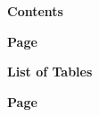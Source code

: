 \renewcommand{\thepage}{(\arabic{page})}
\setcounter{page}{3}         %

\begin{center}
  {\bfseries Contents \par}
\end{center}
\vspace{0.5em}
\noindent\hfill\textbf{Page}\par   %
\vspace{-0.5em}
\makeatletter{}\makeatother

\newpage
\begin{center}
  {\bfseries List of Tables \par}
\end{center}
\vspace{0.5em}
\noindent\hfill\textbf{Page}\par   %
\vspace{-0.5em}
\makeatletter{}\makeatother

\newpage
{}       %
